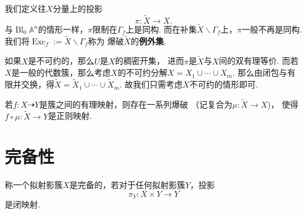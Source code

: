     我们定义往$X$分量上的投影
    \[\pi\colon\widetilde{X} \to X.\]
    与$\operatorname{Bl}_{0}\mathbb{A}^{n}$的情形一样，$\pi$限制在$\Gamma_{f}$上是同构.
    而在补集$\widetilde{X} \backslash \Gamma_{f}$上，$\pi$一般不再是同构.
    我们将$\operatorname{Exc}_{f} := \widetilde{X} \backslash \Gamma_{f}$称为
    爆破$\widetilde{X}$的\textbf{例外集}.

    如果$X$是不可约的，那么$U$是$X$的稠密开集，
    进而$\pi$是$\widetilde{X}$与$X$间的双有理等价. 
    而若$X$是一般的代数簇，那么考虑$X$的不可约分解$X = X_{1} \cup \cdots \cup X_{m}$. 
    那么由闭包与有限并交换，得$\widetilde{X} = \widetilde{X}_{1} \cup \cdots \cup \widetilde{X}_{m}$.
    故我们只需考虑$X$不可约的情形即可.
    

    \begin{theorem}[小平邦彦]
        若$f\colon X \dashrightarrow Y$是簇之间的有理映射，则存在一系列爆破
        （记复合为$\mu\colon\widetilde{X} \rightarrow X$)，
        使得$f \circ \mu\colon\widetilde{X} \rightarrow Y$是正则映射.
    \end{theorem}
    
\section{完备性}
    \begin{definition}
        称一个拟射影簇$X$是完备的，若对于任何拟射影簇$Y$，投影
        \[\pi_{Y}\colon X \times Y \rightarrow Y\]
        是闭映射.
    \end{definition}


